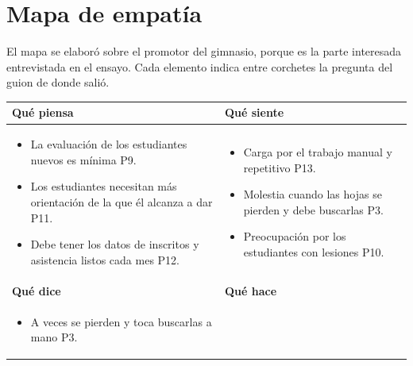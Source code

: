 \documentclass[12pt,a4paper]{article}
\renewcommand{\arraystretch}{1.3}
\begin{document}
\section{Mapa de empatía}

El mapa se elaboró sobre el promotor del gimnasio, porque es la parte interesada entrevistada en el ensayo. Cada elemento indica entre corchetes la pregunta del guion de donde salió.

\begin{table}[H]
\centering
\small
{}
\setlength{\arrayrulewidth}{3pt}
\renewcommand{\arraystretch}{1.35}
\begin{tabularx}{\textwidth}{|Y|Y|}
\hline
{}\textbf{Qué piensa} & \textbf{Qué siente} \\
\hline
{}
\begin{itemize}[leftmargin=*,noitemsep,topsep=0pt,before=\vspace{-0.9\baselineskip},after=\vspace{-\baselineskip}]
  \item La evaluación de los estudiantes nuevos es mínima P9.
  \item Los estudiantes necesitan más orientación de la que él alcanza a dar P11.
  \item Debe tener los datos de inscritos y asistencia listos cada mes P12.
\end{itemize}
&
\begin{itemize}[leftmargin=*,noitemsep,topsep=0pt,before=\vspace{-0.9\baselineskip},after=\vspace{-\baselineskip}]
  \item Carga por el trabajo manual y repetitivo P13.
  \item Molestia cuando las hojas se pierden y debe buscarlas P3.
  \item Preocupación por los estudiantes con lesiones P10.
\end{itemize}
\\
\hline
{}\textbf{Qué dice} & \textbf{Qué hace} \\
\hline
{}
\begin{itemize}[leftmargin=*,noitemsep,topsep=0pt,before=\vspace{-0.9\baselineskip},after=\vspace{-\baselineskip}]
  \item  A veces se pierden y toca buscarlas a mano P3.

\end{itemize}
\end{tabularx}
\end{table}
\end{document}
